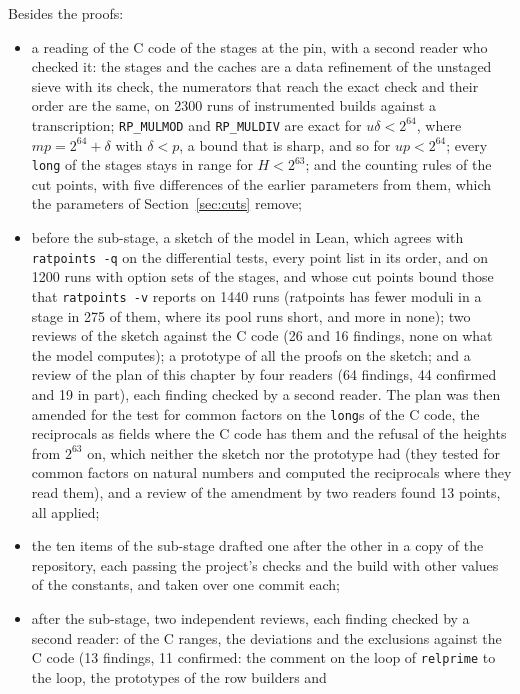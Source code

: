 Besides the proofs:
\begin{itemize}
  \item a reading of the C code of the stages at the pin, with a second reader who checked it: the
    stages and the caches are a data refinement of the unstaged sieve with its check, the numerators
    that reach the exact check and their order are the same, on 2300 runs of instrumented builds
    against a transcription; \verb|RP_MULMOD| and \verb|RP_MULDIV| are exact for $u \delta <
    2^{64}$, where $m p = 2^{64} + \delta$ with $\delta < p$, a bound that is sharp, and so for $u p
    < 2^{64}$; every \verb|long| of the stages stays in range for $H < 2^{63}$; and the counting
    rules of the cut points, with five differences of the earlier parameters from them, which the
    parameters of Section~\ref{sec:cuts} remove;
  \item before the sub-stage, a sketch of the model in Lean, which agrees with \verb|ratpoints -q|
    on the differential tests, every point list in its order, and on 1200 runs with option sets of
    the stages, and whose cut points bound those that \verb|ratpoints -v| reports on 1440 runs
    (ratpoints has fewer moduli in a stage in 275 of them, where its pool runs short, and more in
    none); two reviews of the sketch against the C code (26 and 16 findings, none on what the model
    computes); a prototype of all the proofs on the sketch; and a review of the plan of this chapter
    by four readers (64 findings, 44 confirmed and 19 in part), each finding checked by a second
    reader. The plan was then amended for the test for common factors on the \verb|long|s of the C
    code, the reciprocals as fields where the C code has them and the refusal of the heights from
    $2^{63}$ on, which neither the sketch nor the prototype had (they tested for common factors on
    natural numbers and computed the reciprocals where they read them), and a review of the
    amendment by two readers found 13 points, all applied;
  \item the ten items of the sub-stage drafted one after the other in a copy of the repository, each
    passing the project's checks and the build with other values of the constants, and taken over
    one commit each;
  \item after the sub-stage, two independent reviews, each finding checked by a second reader: of
    the C ranges, the deviations and the exclusions against the C code (13 findings, 11 confirmed:
    the comment on the loop of \verb|relprime| to the loop, the prototypes of the row builders and

\end{itemize}
